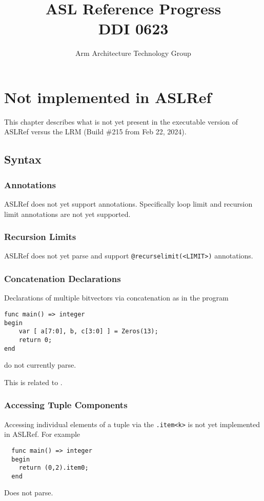 \documentclass{book}
\author{Arm Architecture Technology Group}
\title{ASL Reference Progress \\
       DDI 0623}
\begin{document}
\maketitle

\tableofcontents{}





\chapter{Not implemented in ASLRef}

This chapter describes what is not yet present in the executable version of ASLRef
versus the LRM (Build \#215 from Feb 22, 2024).

\section{Syntax}

\subsection{Annotations}
ASLRef does not yet support annotations.
Specifically loop limit and recursion limit annotations are not yet supported.

\subsection{Recursion Limits}
ASLRef does not yet parse and support \texttt{@recurselimit(<LIMIT>)} annotations.

\subsection{Concatenation Declarations}
Declarations of multiple bitvectors via concatenation as in the program
\begin{Verbatim}
func main() => integer
begin
    var [ a[7:0], b, c[3:0] ] = Zeros(13);
    return 0;
end
\end{Verbatim}
do not currently parse.

This is related to .

\subsection{Accessing Tuple Components}
Accessing individual elements of a tuple via the \texttt{.item<k>} is not yet implemented in ASLRef.
For example
\begin{Verbatim}
  func main() => integer
  begin
    return (0,2).item0;
  end
\end{Verbatim}
Does not parse.
\end{document}
